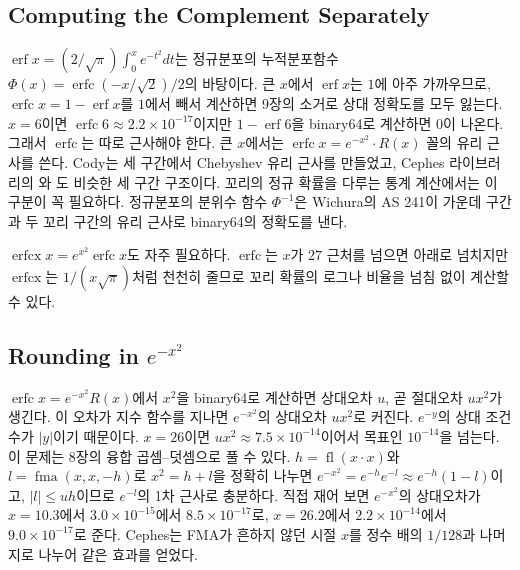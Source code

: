 \subsection{Computing the Complement Separately}

 $\operatorname{erf}x=(2/\sqrt\pi)\int_0^xe^{-t^2}dt$는 정규분포의 누적분포함수 $\Phi(x)=\operatorname{erfc}(-x/\sqrt2)/2$의 바탕이다. 큰 $x$에서 $\operatorname{erf}x$는 $1$에 아주 가까우므로,  $\operatorname{erfc}x=1-\operatorname{erf}x$를 $1$에서 빼서 계산하면 9장의 소거로 상대 정확도를 모두 잃는다. $x=6$이면 $\operatorname{erfc}6\approx2.2\times10^{-17}$이지만 $1-\operatorname{erf}6$을 binary64로 계산하면 $0$이 나온다. 그래서 $\operatorname{erfc}$는 따로 근사해야 한다. 큰 $x$에서는 $\operatorname{erfc}x=e^{-x^2}\cdot R(x)$ 꼴의 유리 근사를 쓴다. Cody는 세 구간에서 Chebyshev 유리 근사를 만들었고\cite{cody1969erf}, Cephes 라이브러리\cite{moshier1989}의 와 도 비슷한 세 구간 구조이다. 꼬리의 정규 확률을 다루는 통계 계산에서는 이 구분이 꼭 필요하다. 정규분포의 분위수 함수 $\Phi^{-1}$은 Wichura의 AS 241이 가운데 구간과 두 꼬리 구간의 유리 근사로 binary64의 정확도를 낸다\cite{wichura1988}.

 $\operatorname{erfcx}x=e^{x^2}\operatorname{erfc}x$도 자주 필요하다. $\operatorname{erfc}$는 $x$가 $27$ 근처를 넘으면 아래로 넘치지만 $\operatorname{erfcx}$는 $1/(x\sqrt\pi)$처럼 천천히 줄므로 꼬리 확률의 로그나 비율을 넘침 없이 계산할 수 있다.

\subsection{Rounding in $e^{-x^2}$}

$\operatorname{erfc}x=e^{-x^2}R(x)$에서 $x^2$을 binary64로 계산하면 상대오차 $u$, 곧 절대오차 $ux^2$가 생긴다. 이 오차가 지수 함수를 지나면 $e^{-x^2}$의 상대오차 $ux^2$로 커진다. $e^{-y}$의 상대 조건수가 $|y|$이기 때문이다. $x=26$이면 $ux^2\approx7.5\times10^{-14}$이어서 목표인 $10^{-14}$을 넘는다. 이 문제는 8장의 융합 곱셈--덧셈으로 풀 수 있다. $h=\operatorname{fl}(x\cdot x)$와 $l=\operatorname{fma}(x,x,-h)$로 $x^2=h+l$을 정확히 나누면 $e^{-x^2}=e^{-h}e^{-l}\approx e^{-h}(1-l)$이고, $|l|\le u h$이므로 $e^{-l}$의 1차 근사로 충분하다. 직접 재어 보면 $e^{-x^2}$의 상대오차가 $x=10.3$에서 $3.0\times10^{-15}$에서 $8.5\times10^{-17}$로, $x=26.2$에서 $2.2\times10^{-14}$에서 $9.0\times10^{-17}$로 준다. Cephes는 FMA가 흔하지 않던 시절 $x$를 정수 배의 $1/128$과 나머지로 나누어 같은 효과를 얻었다.

